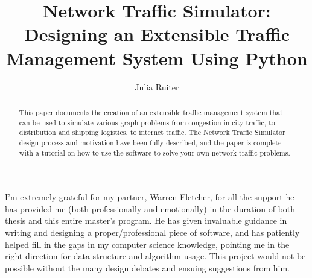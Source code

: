 \documentclass[a4paper,11pt,twoside]{UUthesis}
\title{Network Traffic Simulator:  \\ Designing an Extensible Traffic Management System Using Python}
\author{Julia Ruiter}
\theoremstyle{definition}
\theoremstyle{remark}
\begin{document}

\frontmatter

\maketitle %


\begin{abstract} 
This paper documents the creation of an extensible traffic management system that can be used to simulate various graph problems from congestion in city traffic, to distribution and shipping logistics, to internet traffic.  The Network Traffic Simulator design process and motivation have been fully described, and the paper is complete with a tutorial on how to use the software to solve your own network traffic problems.
\end{abstract}

\begin{acknowledgments}
I'm extremely grateful for my partner, Warren Fletcher, for all the support he has provided me (both professionally and emotionally) in the duration of both thesis and this entire master's program. He has given invaluable guidance in writing and designing a proper/professional piece of software, and has patiently helped fill in the gaps in my computer science knowledge, pointing me in the right direction for data structure and algorithm usage.  This project would not be possible without the many design debates and ensuing suggestions from him.
\end{acknowledgments}

\tableofcontents
\listoffigures


\mainmatter






% 





\backmatter

%
\nocite{*} %




\end{document}

